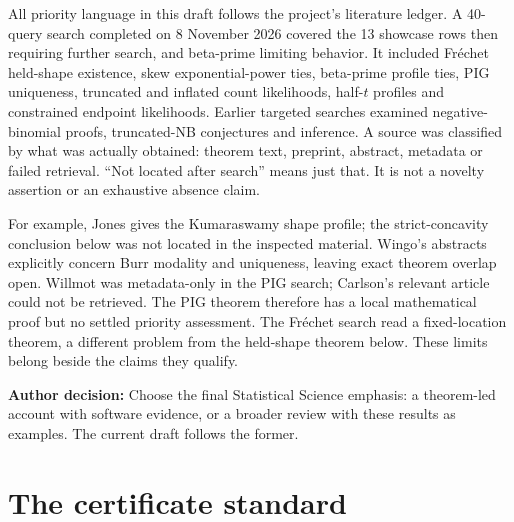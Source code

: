 \documentclass[12pt]{article}
\theoremstyle{definition}
\theoremstyle{remark}
\newcommand{\todo}[1]{\par\smallskip\noindent\textcolor{red!65!black}{\textbf{Author decision:} #1}\par\smallskip}
\begin{document}
All priority language in this draft follows the project's literature ledger.
A 40-query search completed on 8 November 2026 covered the 13 showcase rows
then requiring further search, and beta-prime limiting behavior. It included
Fr\'echet held-shape existence, skew exponential-power ties, beta-prime profile
ties, PIG uniqueness, truncated and inflated count likelihoods, half-$t$
profiles and constrained endpoint likelihoods. Earlier targeted searches
examined negative-binomial proofs, truncated-NB conjectures and inference.
A source was classified by what was actually obtained: theorem text,
preprint, abstract, metadata or failed retrieval. ``Not located after search''
means just that. It is not a novelty assertion or an exhaustive absence claim.

For example, Jones \cite{jones} gives the Kumaraswamy shape profile; the
strict-concavity conclusion below was not located in the inspected material.
Wingo's abstracts \cite{wingo83,wingo93} explicitly concern Burr modality and
uniqueness, leaving exact theorem overlap open. Willmot \cite{willmot} was
metadata-only in the PIG search; Carlson's relevant article could not be
retrieved. The PIG theorem therefore has a local mathematical proof but no
settled priority assessment. The Fr\'echet search read a fixed-location theorem,
a different problem from the held-shape theorem below. These limits belong
beside the claims they qualify.
\todo{Choose the final Statistical Science emphasis: a theorem-led account with software evidence, or a broader review with these results as examples. The current draft follows the former.}

\section{The certificate standard}\label{sec:standard}
\end{document}
